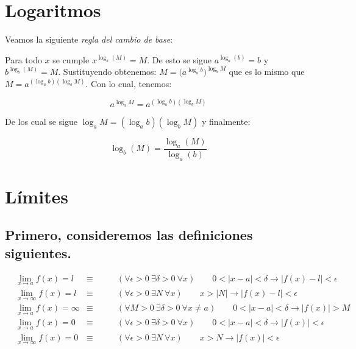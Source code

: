 \documentclass[12pt,a4paper]{article}
\begin{document}
\section{Logaritmos}
Veamos la siguiente \emph{regla del cambio de base}:

Para todo \( x \)  se cumple \( x^{\log_x(M)} = M \). De esto se sigue
\( a^{\log_a(b)} = b \) y \( b^{\log_b(M)} = M \). Sustituyendo
obtenemos: \(M= \big(a^{\log_a b}\big)^{\log_b M} \) que es lo mismo que
\(M= a^{(\log_a b)(\log_b M)}   \). Con lo cual, tenemos:


\[a^{\log_a M} = a^{(\log_a b)(\log_b M)} \]

De los cual se sigue \( \log_a M = (\log_a b)(\log_b M) \)  y
finalmente:

\begin{equation}
\log_b(M) = \frac{\log_a(M)}{\log_a(b)}
\end{equation}


\section{L\'imites}

\subsection{Primero, consideremos las definiciones siguientes.}
\vspace{.5cm}


\begin{align*}
&\lim_{x \to a}f(x) = l  &  \equiv \qquad  &
( \forall \epsilon > 0 \ \exists \delta > 0 \ \forall x)  \qquad   0<|x-a|< \delta  \to  |f(x) - l| <
\epsilon  & \\
&\lim_{x \to \infty}f(x) = l  &  \equiv  \qquad &
(\forall \epsilon > 0 \ \exists N \ \forall x) \qquad  x > |N|  \to
 |f(x) - l| < \epsilon & \\
&\lim_{x \to a}f(x) = \infty  &  \equiv \qquad  &
(\forall M > 0 \ \exists \delta > 0 \ \forall x \neq a) \qquad   0<|x-a| < \delta  \to  |f(x)| >
M  & \\
&\lim_{x \to a}f(x) = 0  &  \equiv   \qquad  &
(\forall \epsilon > 0 \ \exists \delta > 0 \ \forall x) \qquad   0<|x-a| < \delta  \to  |f(x)| <
\epsilon & \\
&\lim_{x \to \infty}f(x) = 0  &  \equiv \qquad  &
(\forall \epsilon > 0 \ \exists N \ \forall x) \qquad   x > N  \to
 |f(x)| < \epsilon & \\
\end{align*}
\end{document}
